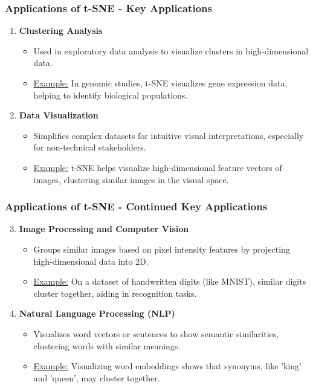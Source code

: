 \documentclass[aspectratio=169]{beamer}
\begin{document}
\begin{frame}[fragile]
    \frametitle{Applications of t-SNE - Key Applications}
    \begin{enumerate}
        \item \textbf{Clustering Analysis}
        \begin{itemize}
            \item Used in exploratory data analysis to visualize clusters in high-dimensional data.
            \item \underline{Example:} In genomic studies, t-SNE visualizes gene expression data, helping to identify biological populations.
        \end{itemize}

        \item \textbf{Data Visualization}
        \begin{itemize}
            \item Simplifies complex datasets for intuitive visual interpretations, especially for non-technical stakeholders.
            \item \underline{Example:} t-SNE helps visualize high-dimensional feature vectors of images, clustering similar images in the visual space.
        \end{itemize}
    \end{enumerate}
\end{frame}

\begin{frame}[fragile]
    \frametitle{Applications of t-SNE - Continued Key Applications}
    \begin{enumerate}
        \setcounter{enumi}{2}
        \item \textbf{Image Processing and Computer Vision}
        \begin{itemize}
            \item Groups similar images based on pixel intensity features by projecting high-dimensional data into 2D.
            \item \underline{Example:} On a dataset of handwritten digits (like MNIST), similar digits cluster together, aiding in recognition tasks.
        \end{itemize}

        \item \textbf{Natural Language Processing (NLP)}
        \begin{itemize}
            \item Visualizes word vectors or sentences to show semantic similarities, clustering words with similar meanings.
            \item \underline{Example:} Visualizing word embeddings shows that synonyms, like 'king' and 'queen', may cluster together.
        \end{itemize}
    \end{enumerate}
\end{frame}
\end{document}

